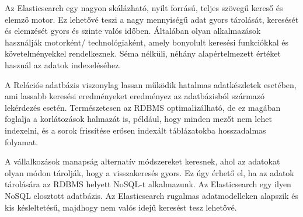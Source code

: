 

Az Elasticsearch egy nagyon skálázható, nyílt forrású, teljes szövegű kereső és elemző motor. Ez lehetővé teszi a nagy mennyiségű adat gyors tárolását, keresését és elemzését gyors és szinte valós időben. Általában olyan alkalmazások használják motorként/ technológiaként, amely bonyolult keresési funkciókkal és követelményekkel rendelkeznek. Séma nélküli, néhány alapértelmezett értéket használ az adatok indexeléséhez.

A Relációs adatbázis viszonylag lassan működik hatalmas adatkészletek esetében, ami lassabb keresési eredményeket eredményez az adatbázisból származó lekérdezés esetén. Természetesen az RDBMS optimalizálható, de ez magában foglalja a korlátozások halmazát is, például, hogy minden mezőt nem lehet indexelni, és a sorok frissítése erősen indexált táblázatokba hosszadalmas folyamat.

A vállalkozások manapság alternatív módszereket keresnek, ahol az adatokat olyan módon tárolják, hogy a visszakeresés gyors. Ez úgy érhető el, ha az adatok tárolására az RDBMS helyett NoSQL-t alkalmazunk. Az Elasticsearch egy ilyen NoSQL elosztott adatbázis. Az Elasticsearch rugalmas adatmodelleken alapszik és kis késleltetésű, majdhogy nem valós idejű keresést tesz lehetővé.


